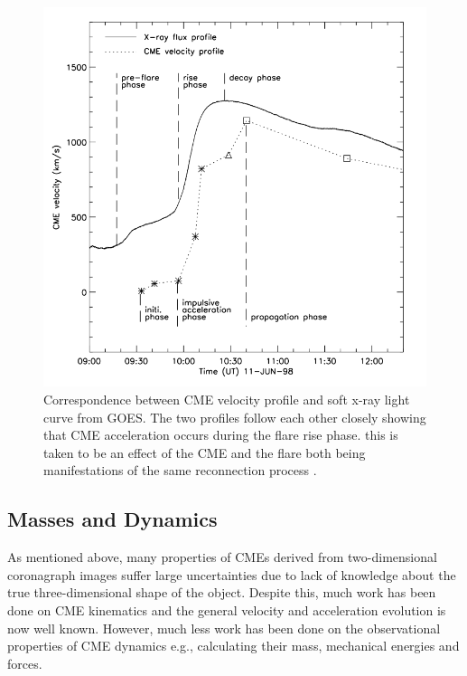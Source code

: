 \begin{figure}[t!]
\begin{center}
\includegraphics[scale=0.4, trim =0cm 1cm 0cm 1cm]{images/zhang2001}
\caption[CME speed profile along side flare X-ray light curve]{Correspondence between CME velocity profile and soft x-ray light curve from GOES. The two profiles follow each other closely showing that CME acceleration occurs during the flare rise phase. this is taken to be an effect of the CME and the flare both being manifestations of the same reconnection process \citet{zhang2001}.}
\label{fig:zhang2001}
\end{center}
\end{figure}

\subsection{Masses and Dynamics}

As mentioned above, many properties of CMEs derived from two-dimensional coronagraph images suffer large uncertainties due to lack of knowledge about the true three-dimensional shape of the object. Despite this, much work has been done on CME kinematics and the general velocity and acceleration evolution is now well known. However, much less work has been done on the observational properties of CME dynamics e.g., calculating their mass, mechanical energies and forces. 

